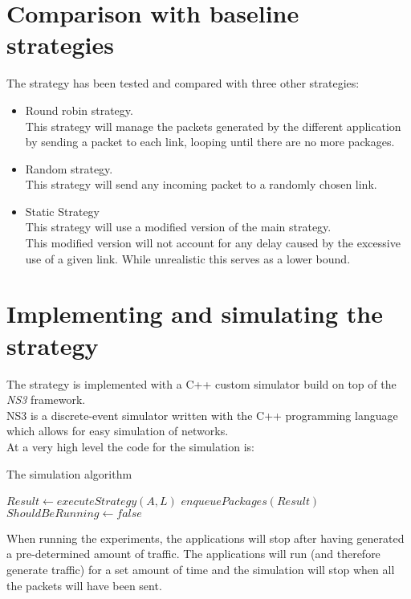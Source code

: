 \documentclass{article}
\begin{document}
	
	\section{Comparison with baseline strategies}
	The strategy has been tested and compared with three other strategies:
	\begin{itemize}
		\item Round robin strategy. \\
		This strategy will manage the packets generated by the different application by sending a packet to each link, looping until there are no more packages.
		\item Random strategy. \\
		This strategy will send any incoming packet to a randomly chosen link.
		\item Static Strategy \\
		This strategy will use a modified version of the main strategy. \\
		This modified version will not account for any delay caused by the excessive use of a given link. While unrealistic this   serves as a lower bound.
	\end{itemize}
	
	\section{Implementing and simulating the strategy}
	The strategy is implemented with a C++ custom simulator build on top of the \textit{NS3} \cite{ns3} framework. \\
	NS3 is a discrete-event simulator written with the C++ programming language which allows for easy simulation of networks. \\
		
	At a very high level the code for the simulation is:
	
	\begin{algorithm}
		\caption{The simulation algorithm}
		\begin{algorithmic}
			\State $Result \gets executeStrategy(A, L)$
			\State $enqueuePackages(Result)$
			\State $ShouldBeRunning \gets false$
			\EndIf
			\EndWhile
		\end{algorithmic}
	\end{algorithm}
	
	When running the experiments, the applications will stop after having generated a pre-determined amount of traffic. The applications will run (and therefore generate traffic) for a set amount of time and the simulation will stop when all the packets will have been sent.
	
\end{document}

